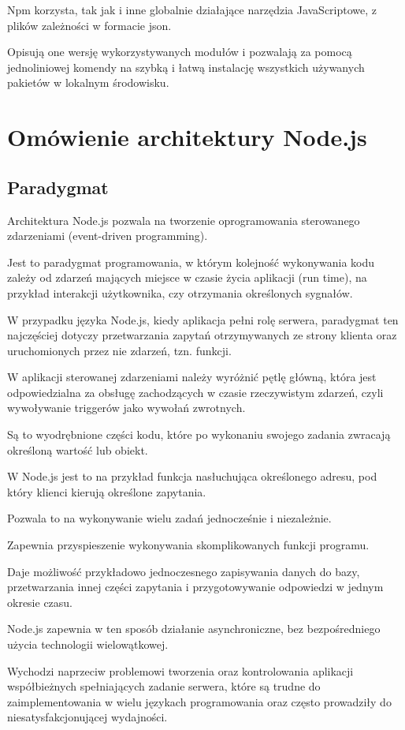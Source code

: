 \documentclass[12pt]{report}
\begin{document}
Npm korzysta, tak jak i inne globalnie działające narzędzia JavaScriptowe, z plików zależności w formacie json.

Opisują one wersję wykorzystywanych modułów i pozwalają za pomocą jednoliniowej komendy na szybką i łatwą instalację wszystkich używanych pakietów w lokalnym środowisku.


\chapter{Omówienie architektury Node.js}

\section{Paradygmat}
Architektura Node.js pozwala na tworzenie oprogramowania sterowanego zdarzeniami (event-driven programming).

Jest to paradygmat programowania, w którym kolejność wykonywania kodu zależy od zdarzeń mających miejsce w czasie życia aplikacji (run time), na przykład interakcji użytkownika, czy otrzymania określonych sygnałów.

W przypadku języka Node.js, kiedy aplikacja pełni rolę serwera, paradygmat ten najczęściej dotyczy przetwarzania zapytań otrzymywanych ze strony klienta oraz uruchomionych przez nie zdarzeń, tzn.
funkcji.

W aplikacji sterowanej zdarzeniami należy wyróżnić pętlę główną, która jest odpowiedzialna za obsługę zachodzących w czasie rzeczywistym zdarzeń, czyli wywoływanie triggerów jako wywołań zwrotnych.

Są to wyodrębnione części kodu, które po wykonaniu swojego zadania zwracają określoną wartość lub obiekt.

W Node.js jest to na przykład funkcja nasłuchująca określonego adresu, pod który klienci kierują określone zapytania.

Pozwala to na wykonywanie wielu zadań jednocześnie i niezależnie.

Zapewnia przyspieszenie wykonywania skomplikowanych funkcji programu.

Daje możliwość przykładowo jednoczesnego zapisywania danych do bazy, przetwarzania innej części zapytania i przygotowywanie odpowiedzi w jednym okresie czasu.

Node.js zapewnia w ten sposób działanie asynchroniczne, bez bezpośredniego użycia technologii wielowątkowej.

Wychodzi naprzeciw problemowi tworzenia oraz kontrolowania aplikacji współbieżnych spełniających zadanie serwera, które są trudne do zaimplementowania w wielu językach programowania oraz często prowadziły do niesatysfakcjonującej wydajności.
\end{document}
